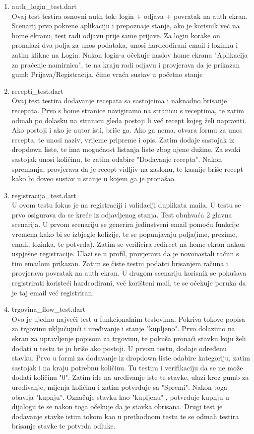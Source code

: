 \documentclass[diplomskirad]{fer}
\begin{document}
\begin{enumerate}
    \item auth\_login\_test.dart
    \\
    Ovaj test testira osnovni auth tok: login + odjava + povratak na auth ekran. Scenarij prvo pokrene aplikaciju i prepoznaje stanje, ako je korisnik već na home ekranu, test radi odjavu prije same prijave. Za login korake on pronalazi dva polja za unos podataka, unosi hardcodirani email i lozinku i zatim klikne na Login. Nakon login-a očekuje naslov home ekrana "Aplikacija za praćenje namirnica", te na kraju radi odjavu i provjerava da je prikazan gumb Prijava/Registracija. čime vraća sustav u početno stanje
    \item recepti\_test.dart
    \\
    Ovaj test testira dodavanje recepata sa sastojcima i naknadno brisanje recepata. Prvo s home stranice navigiramo na stranicu s receptima, te zatim odmah po dolasku na stranicu gleda postoji li već recept kojeg želi napraviti. Ako postoji i ako je autor isti, briše ga. Ako ga nema, otvara formu za unos recepta, te unosi naziv, vrijeme pripreme i opis. Zatim dodaje sastojak iz dropdown liste, te ima mogućnost listanja liste zbog njene dužine. Za svaki sastojak unosi količinu, te zatim odabire "Dodavanje recepta". Nakon spremanja, provjerava da je recept vidljiv na zaslonu, te kasnije briše recept kako bi doveo sustav u stanje u kojem ga je pronašao.
    \item registracija\_test.dart
    \\
    U ovom testu fokus je na registraciji i validaciji duplikata maila. U testu se prvo osigurava da se kreće iz odjavljenog stanja. Test obuhvaća 2 glavna scenarija. U prvom scenariju se generira jedinstveni email pomoću funkcije vremena kako bi se izbjegle kolizije, te se popunjavaju polja(ime, prezime, email, lozinka, te potvrda). Zatim se verificira redirect na home ekran nakon uspješne registracije. Ulazi se u profil, provjerava da je novonastali račun s tim emailom prikazan. Zatim se čiste testni podatci brisanjem računa i provjerava povratak na auth ekran. U drugom scenariju korisnik se pokušava registrirati koristeći hardcodirani, već korišteni mail, te se očekuje poruka da je taj email već registriran.
    \item trgovina\_flow\_test.dart
    \\
    Ovo je ujedno najveći test u funkcionalnim testovima. Pokriva tokove popisa za trgovinu uključujući i uređivanje i stanje "kupljeno". Prvo dolazimo na ekran za upravljenje popisom za trgovinu, te pokuša pronaći stavku koju želi dodati u testu te ju briše ako postoji. U prvom testu, dodaje određenu stavku. Prvo u formi za dodavanje iz dropdown liste odabire kategoriju, zatim sastojak i na kraju potrebnu količinu. Tu testira i verifikaciju da se ne može dodati količinu "0". Zatim ide na uređivanje iste te stavke, ulazi kroz gumb za uređivanje, mijenja količinu i zatim potvrđuje sa "Spremi". Nakon toga obavlja "kupnju". Označuje stavku kao "kupljenu" , potvrđuje kupnju u dijalogu te se nakon toga očekuje da je stavka obrisana. Drugi test je dodavanje stavke istim tokom kao u prethodnom testu te se odmah testira brisanje stavke te potvrda odluke.

\end{enumerate}
\end{document}
